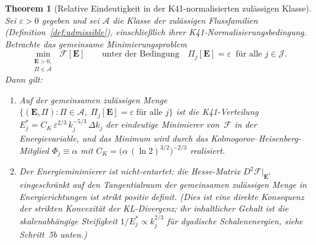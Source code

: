 \documentclass[12pt,a4paper]{article}
\theoremstyle{definition}
\theoremstyle{plain}
\newtheorem{theorem}[definition]{Theorem}
\theoremstyle{remark}
\begin{document}
\begin{theorem}[Relative Eindeutigkeit in der K41-normalisierten zulässigen Klasse]\label{thm:K41}
Sei $\varepsilon > 0$ gegeben und sei $\mathscr{A}$ die Klasse der
zulässigen Flussfamilien (Definition~\ref{def:admissible}), einschließlich
ihrer K41-Normalisierungsbedingung.
Betrachte das \emph{gemeinsame} Minimierungsproblem
\begin{equation}\label{eq:min}
  \min_{\substack{\mathbf{E} > 0,\\ \Pi \in \mathscr{A}}}
  \;\mathcal{F}[\mathbf{E}]
  \qquad \text{unter der Bedingung} \quad
  \Pi_j[\mathbf{E}] = \varepsilon
  \;\;\text{für alle } j \in \mathcal{J}.
\end{equation}
Dann gilt:
\begin{enumerate}
  \item[\textup{(i)}]
    Auf der gemeinsamen zulässigen Menge
    $\{(\mathbf{E},\Pi):\Pi\in\mathscr{A},\;
    \Pi_j[\mathbf{E}]=\varepsilon\;\text{für alle }j\}$ ist die
    K41-Verteilung
    $E_j^* = C_K\,\varepsilon^{2/3}\,k_j^{-5/3}\,\Delta k_j$
    der eindeutige Minimierer von~$\mathcal{F}$ in der Energievariable,
    und das Minimum wird
    durch das Kolmogorov--Heisenberg-Mitglied $\Phi_j \equiv \alpha$ mit
    $C_K = \bigl(\alpha\,(\ln 2)^{3/2}\bigr)^{-2/3}$ realisiert.
  \item[\textup{(ii)}]
    Der Energieminimierer ist nicht-entartet: die Hesse-Matrix
    $D^2\mathcal{F}|_{\mathbf{E}^*}$ eingeschränkt auf den Tangentialraum der
    gemeinsamen zulässigen Menge in Energierichtungen ist strikt positiv
    definit. (Dies ist eine direkte Konsequenz der strikten Konvexität der
    KL-Divergenz; ihr inhaltlicher Gehalt ist die skalenabhängige Steifigkeit
    $1/E_j^* \propto k_j^{2/3}$ für dyadische Schalenenergien,
    siehe Schritt~5b unten.)
\end{enumerate}
\end{theorem}
\end{document}
